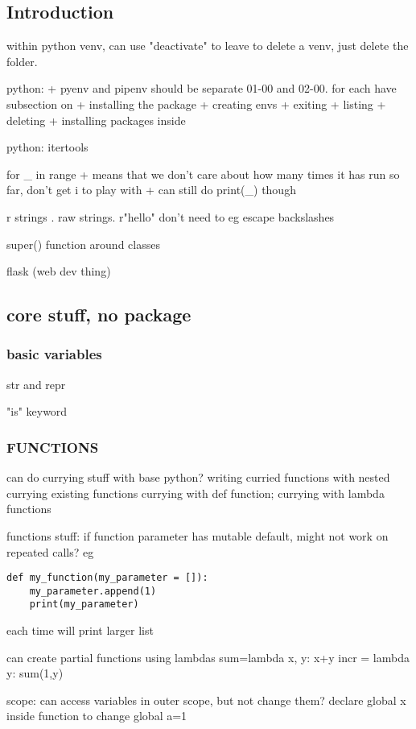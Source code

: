 
\subsection{Introduction}


within python venv, can use "deactivate" to leave
to delete a venv, just delete the folder.

python:
+ pyenv and pipenv should be separate 01-00 and 02-00. for each have subsection on
+ installing the package
+ creating envs
+ exiting
+ listing
+ deleting
+ installing packages inside


python: itertools

for \_ in range
+ means that we don't care about how many times it has run so far, don't get i to play with
+ can still do print(\_) though

r strings . raw strings.
r"hello"
don't need to eg escape backslashes

super() function around classes

flask (web dev thing)


\subsection{core stuff, no package}
\subsubsection{basic variables}
str and repr

"is" keyword
\subsubsection{FUNCTIONS}

can do currying stuff with base python?
writing curried functions with nested
currying existing functions
currying with def function; currying with lambda functions


functions stuff:
if function parameter has mutable default, might not work on repeated calls?
eg
\begin{verbatim}
def my_function(my_parameter = []):
    my_parameter.append(1)
    print(my_parameter)
\end{verbatim}
each time will print larger list


can create partial functions using lambdas
sum=lambda x, y: x+y
incr = lambda y: sum(1,y)


scope:
can access variables in outer scope, but not change them?
declare global x inside function to change global
a=1

